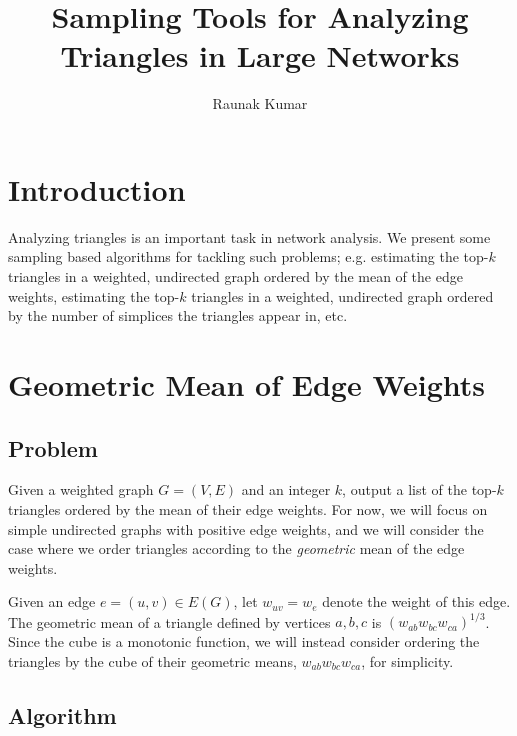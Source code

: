 \documentclass{article}
\title{Sampling Tools for Analyzing Triangles in Large Networks}
\author{Raunak Kumar}
\begin{document}
\maketitle
\tableofcontents


\section{Introduction}

Analyzing triangles is an important task in network analysis. We
present some sampling based algorithms for tackling such problems;
e.g. estimating the top-$k$ triangles in a weighted, undirected
graph ordered by the mean of the edge weights, estimating the
top-$k$ triangles in a weighted, undirected graph ordered by the
number of simplices the triangles appear in, etc.


\section{Geometric Mean of Edge Weights}

\subsection{Problem}
Given
a weighted graph $G = (V, E)$ and an integer $k$, output a list
of the top-$k$ triangles ordered by the mean of their edge 
weights. For now, we will focus on simple undirected graphs with positive
edge weights, and we will consider the case where we order
triangles according to the \emph{geometric} mean of the edge
weights.

Given an edge $e = (u,v) \in E(G)$, let $w_{uv} = w_e$ denote the
weight of this edge. The geometric mean of a triangle defined by
vertices $a, b, c$ is $(w_{ab}w_{bc}w_{ca})^{1/3}$. Since the
cube is a monotonic function, we will instead consider ordering the 
triangles by the cube of their geometric means,
$w_{ab} w_{bc} w_{ca}$, for simplicity.


\subsection{Algorithm}
\end{document}
